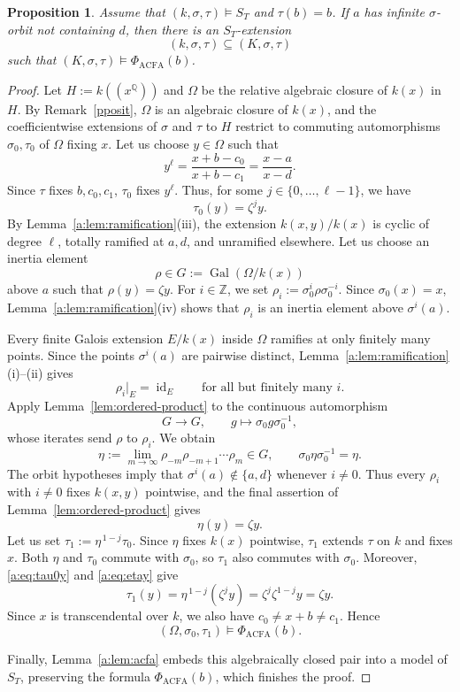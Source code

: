 \documentclass[10pt,a4paper]{amsart}
\newtheorem{proposition}[theorem]{Proposition}
\theoremstyle{definition}
\newcommand{\Q}{\mathbb Q}
\newcommand{\Z}{\mathbb Z}
\DeclareMathOperator{\Gal}{Gal}
\DeclareMathOperator{\id}{id}
\begin{document}
\begin{proposition}\label{a:prop:realization}
Assume that $(k,\sigma,\tau)\models S_T$ and $\tau(b)=b$.
If $a$ has infinite $\sigma$-orbit not containing $d$, then there is an $S_T$-extension
\[
(k,\sigma,\tau)\subseteq(K,\sigma,\tau)
\]
such that $(K,\sigma,\tau)\models\Phi_{\mathrm{ACFA}}(b)$.
\end{proposition}
\begin{proof}
Let $H:=k((x^{\Q}))$ and $\Omega$ be the relative algebraic closure of $k(x)$
in $H$. By Remark~\ref{pposit}, $\Omega$ is an algebraic closure
of $k(x)$, and the coefficientwise extensions of $\sigma$ and
$\tau$ to $H$ restrict to commuting automorphisms $\sigma_0,\tau_0$
of $\Omega$ fixing $x$. Let us choose $y\in\Omega$ such that
\[
y^\ell=\frac{x+b-c_0}{x+b-c_1}
      =\frac{x-a}{x-d}.
\]
Since $\tau$ fixes $b,c_0,c_1$, $\tau_0$
fixes $y^\ell$. Thus, for some
$j\in\{0,\ldots,\ell-1\}$, we have
\begin{equation}\label{a:eq:tau0y}
\tau_0(y)=\zeta^j y.
\end{equation}
By Lemma~\ref{a:lem:ramification}(iii), the extension
$k(x,y)/k(x)$ is cyclic of degree $\ell$, totally ramified
at $a,d$, and unramified elsewhere. Let us choose an inertia element
\[
\rho\in G:=\Gal(\Omega/k(x))
\]
above $a$ such that $\rho(y)=\zeta y$.
For $i\in\Z$, we set $\rho_i:=\sigma_0^i\rho\sigma_0^{-i}$. 
Since $\sigma_0(x)=x$, Lemma~\ref{a:lem:ramification}(iv)
shows that $\rho_i$ is an inertia element above $\sigma^i(a)$.

Every finite Galois extension $E/k(x)$ inside $\Omega$
ramifies at only finitely many points. Since the points
$\sigma^i(a)$ are pairwise distinct,
Lemma~\ref{a:lem:ramification}(i)--(ii) gives
\[
\rho_i|_E=\id_E
\qquad\text{for all but finitely many }i.
\]
Apply Lemma~\ref{lem:ordered-product} to the continuous
automorphism
\[
G\longrightarrow G,\qquad
g\longmapsto\sigma_0g\sigma_0^{-1},
\]
whose iterates send $\rho$ to $\rho_i$.
We obtain
\[
\eta:=\lim_{m\to\infty}\rho_{-m}\rho_{-m+1}\cdots\rho_m\in G,
\qquad
\sigma_0\eta\sigma_0^{-1}=\eta.
\]
The orbit hypotheses imply that
$\sigma^i(a)\notin\{a,d\}$ whenever $i\ne0$.
Thus every $\rho_i$ with $i\ne0$ fixes $k(x,y)$ pointwise,
and the final assertion of Lemma~\ref{lem:ordered-product}
gives
\begin{equation}\label{a:eq:etay}
\eta(y)=\zeta y.
\end{equation}
Let us set $\tau_1:=\eta^{\,1-j}\tau_0$. 
Since $\eta$ fixes $k(x)$ pointwise, $\tau_1$ extends $\tau$
on $k$ and fixes $x$. Both $\eta$ and $\tau_0$ commute with
$\sigma_0$, so $\tau_1$ also commutes with $\sigma_0$.
Moreover, \eqref{a:eq:tau0y} and \eqref{a:eq:etay} give
\[
\tau_1(y)
=\eta^{\,1-j}(\zeta^j y)
=\zeta^j\zeta^{1-j}y
=\zeta y.
\]
Since $x$ is transcendental over $k$, we also have
$c_0\ne x+b\ne c_1$. Hence
\[
(\Omega,\sigma_0,\tau_1)\models\Phi_{\mathrm{ACFA}}(b).
\]

Finally, Lemma~\ref{a:lem:acfa} embeds this algebraically
closed pair into a model of $S_T$, preserving the formula
$\Phi_{\mathrm{ACFA}}(b)$, which finishes the proof.
\end{proof}
\end{document}
